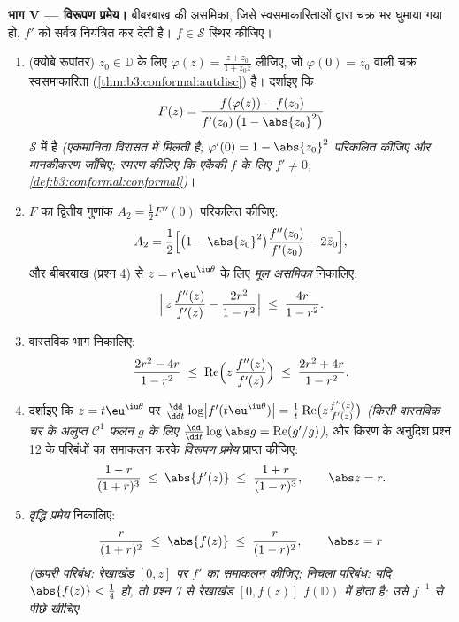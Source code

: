 \begin{problem}
\medskip
\noindent\textbf{भाग V --- विरूपण प्रमेय।} बीबरबाख की असमिका,
जिसे स्वसमाकारिताओं द्वारा चक्र भर घुमाया गया हो, $f'$ को
सर्वत्र नियंत्रित कर देती है। $f \in \mathcal
S$ स्थिर कीजिए।
\begin{enumerate}[resume]
  \item (क्योबे रूपांतर) $z_0 \in \mathbb D$ के लिए $\varphi(z) = \frac{z + z_0}{1 + \bar z_0z}$ लीजिए, जो $\varphi(0) = z_0$ वाली
        चक्र स्वसमाकारिता (\cref{thm:b3:conformal:autdisc}) है। दर्शाइए कि
        \[
        F(z) = \frac{f(\varphi(z)) - f(z_0)}
        {f'(z_0)\,\bigl(1 - \abs{z_0}^2\bigr)}
        \]
        $\mathcal S$ में है \emph{(एकमानिता विरासत में मिलती है; $\varphi'(0) = 1 - \abs{z_0}^2$
        परिकलित कीजिए और मानकीकरण जाँचिए; स्मरण कीजिए कि एकैकी
        $f$ के लिए $f' \neq 0$, \cref{def:b3:conformal:conformal})}।
  \item $F$ का द्वितीय गुणांक $A_2 = \frac12F''(0)$ परिकलित कीजिए:
        \[
        A_2 = \frac12\Bigl[\bigl(1 - \abs{z_0}^2\bigr)
        \frac{f''(z_0)}{f'(z_0)} - 2\bar z_0\Bigr] ,
        \]
        और बीबरबाख (प्रश्न 4) से $z =
        r\eu^{\iu\theta}$ के लिए \emph{मूल असमिका}
        निकालिए:
        \[
        \Bigl|\,z\,\frac{f''(z)}{f'(z)} -
        \frac{2r^2}{1 - r^2}\Bigr|
        \;\leq\; \frac{4r}{1 - r^2} .
        \]
  \item वास्तविक भाग निकालिए:
        \[
        \frac{2r^2 - 4r}{1 - r^2} \;\leq\;
        \operatorname{Re}\Bigl(z\,\frac{f''(z)}{f'(z)}\Bigr)
        \;\leq\; \frac{2r^2 + 4r}{1 - r^2} .
        \]
  \item दर्शाइए कि $z = t\eu^{\iu\theta}$ पर $\frac{\dd}{\dd t}\log\bigl|
        f'(t\eu^{\iu\theta})\bigr| = \frac1t
        \operatorname{Re}\bigl(z\frac{f''(z)}{f'(z)}\bigr)$ \emph{(किसी वास्तविक चर के
        अलुप्त $\mathcal C^1$ फलन $g$ के लिए $\frac{\dd}{\dd t}\log\abs g =
        \operatorname{Re}(g'/g)$)}, और किरण के अनुदिश
        प्रश्न 12 के परिबंधों का समाकलन करके \emph{विरूपण प्रमेय}
        प्राप्त कीजिए:
        \[
        \frac{1 - r}{(1 + r)^3} \;\leq\; \abs{f'(z)}
        \;\leq\; \frac{1 + r}{(1 - r)^3},
        \qquad \abs z = r .
        \]
  \item \emph{वृद्धि प्रमेय} निकालिए:
        \[
        \frac{r}{(1 + r)^2} \;\leq\; \abs{f(z)} \;\leq\;
        \frac{r}{(1 - r)^2},
        \qquad \abs z = r
        \]
        \emph{(ऊपरी परिबंध: रेखाखंड $[0, z]$ पर $f'$ का समाकलन
        कीजिए; निचला परिबंध: यदि $\abs{f(z)} < \frac14$ हो, तो प्रश्न 7 से
        रेखाखंड $[0, f(z)]$ $f(\mathbb D)$ में होता है; उसे $f^{-1}$ से पीछे खींचिए
}
\end{enumerate}
\end{problem}
